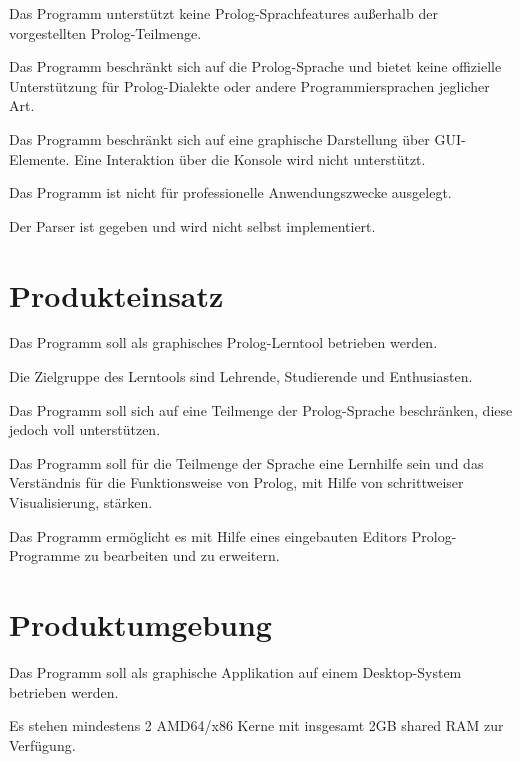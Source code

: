 \documentclass[parskip=full,11pt,twoside]{scrartcl}
\begin{document}

Das Programm unterstützt keine Prolog-Sprachfeatures außerhalb der vorgestellten Prolog-Teilmenge.


Das Programm beschränkt sich auf die Prolog-Sprache und bietet keine offizielle Unterstützung für Prolog-Dialekte oder andere Programmiersprachen jeglicher Art.


Das Programm beschränkt sich auf eine graphische Darstellung über GUI-Elemente. Eine Interaktion über die Konsole wird nicht unterstützt.


Das Programm ist nicht für professionelle Anwendungszwecke ausgelegt.


Der Parser ist gegeben und wird nicht selbst implementiert.

\section{Produkteinsatz}

Das Programm soll als graphisches Prolog-Lerntool betrieben werden.

Die Zielgruppe des Lerntools sind Lehrende, Studierende und Enthusiasten.

Das Programm soll sich auf eine Teilmenge der Prolog-Sprache beschränken, diese jedoch voll unterstützen.

Das Programm soll für die Teilmenge der Sprache eine Lernhilfe sein und das Verständnis für die Funktionsweise von Prolog, mit Hilfe von schrittweiser Visualisierung, stärken.

Das Programm ermöglicht es mit Hilfe eines eingebauten Editors Prolog-Programme zu bearbeiten und zu erweitern.

\section{Produktumgebung}

Das Programm soll als graphische Applikation auf einem Desktop-System betrieben werden.

Es stehen mindestens 2 AMD64/x86 Kerne mit insgesamt 2GB shared RAM zur Verfügung.
\end{document}
